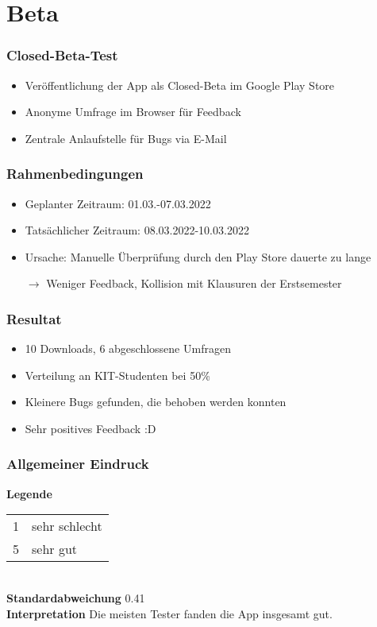 \section{Beta}

\begin{frame}\frametitle{Closed-Beta-Test}
    \begin{itemize}
        \item Veröffentlichung der App als Closed-Beta im Google Play Store
        \item Anonyme Umfrage im Browser für Feedback
        \item Zentrale Anlaufstelle für Bugs via E-Mail
    \end{itemize}
\end{frame}

\begin{frame}\frametitle{Rahmenbedingungen}
    \begin{itemize}
        \item Geplanter Zeitraum: 01.03.-07.03.2022
        \item Tatsächlicher Zeitraum: 08.03.2022-10.03.2022
        \item Ursache: Manuelle Überprüfung durch den Play Store dauerte zu lange
        \item[$\rightarrow$] Weniger Feedback, Kollision mit Klausuren der Erstsemester
    \end{itemize}
\end{frame}

\begin{frame}\frametitle{Resultat}
    \begin{itemize}
        \item 10 Downloads, 6 abgeschlossene Umfragen
        \item Verteilung an KIT-Studenten bei 50\%
        \item Kleinere Bugs gefunden, die behoben werden konnten
        \item Sehr positives Feedback :D
    \end{itemize}
\end{frame}

\begin{frame}\frametitle{Allgemeiner Eindruck}
    \begin{minipage}{\textwidth}
        \begin{minipage}{.49\textwidth}
        \end{minipage}
        \begin{minipage}{.49\textwidth}
            \textbf{Legende} 
            \begin{tabular}{l l}
                1 & sehr schlecht \\
                5 & sehr gut
            \end{tabular}\\
            \textbf{Standardabweichung}
            0.41\\
            \textbf{Interpretation}
            Die meisten Tester fanden die App insgesamt gut.
        \end{minipage}
    \end{minipage}
\end{frame}

